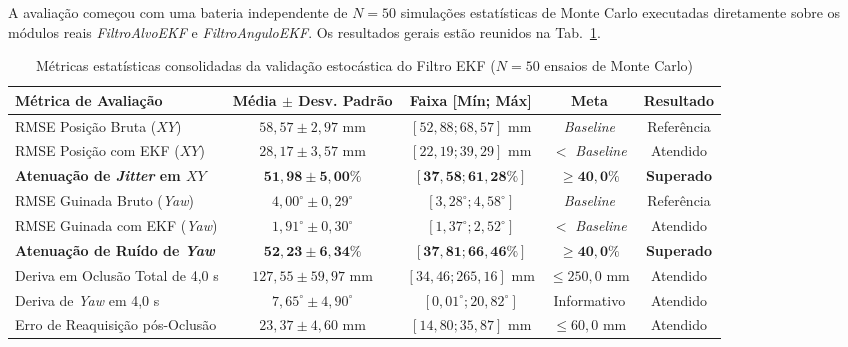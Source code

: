 A avaliação começou com uma bateria independente de $N = 50$ simulações estatísticas de Monte Carlo executadas diretamente sobre os módulos reais \textit{FiltroAlvoEKF} e \textit{FiltroAnguloEKF}. Os resultados gerais estão reunidos na Tab.~\ref{tab:validacao_ekf_resultados}.

\begin{table}[H]
	\centering
	\footnotesize
	\setlength{\tabcolsep}{2pt}
	\captionsetup{justification=centering}
	\caption{Métricas estatísticas consolidadas da validação estocástica do Filtro EKF ($N = 50$ ensaios de Monte Carlo)}
	\label{tab:validacao_ekf_resultados}
	\vspace{0.2cm}
	\begin{tabular}{>{\raggedright\arraybackslash}p{3.8cm}cccc}
		\hline
		\textbf{Métrica de Avaliação} & \textbf{Média $\pm$ Desv. Padrão} & \textbf{Faixa [Mín; Máx]} & \textbf{Meta} & \textbf{Resultado} \\
		\hline
		RMSE Posição Bruta ($XY$) & $58{,}57 \pm 2{,}97\text{ mm}$ & $[52{,}88; 68{,}57]\text{ mm}$ & \textit{Baseline} & Referência \\
		RMSE Posição com EKF ($XY$) & $28{,}17 \pm 3{,}57\text{ mm}$ & $[22{,}19; 39{,}29]\text{ mm}$ & $<$ \textit{Baseline} & Atendido \\
		\textbf{Atenuação de \textit{Jitter} em $XY$} & $\mathbf{51{,}98 \pm 5{,}00\%}$ & $[\mathbf{37{,}58; 61{,}28\%}]$ & $\mathbf{\ge 40{,}0\%}$ & \textbf{Superado} \\
		RMSE Guinada Bruto (\textit{Yaw}) & $4{,}00^\circ \pm 0{,}29^\circ$ & $[3{,}28^\circ; 4{,}58^\circ]$ & \textit{Baseline} & Referência \\
		RMSE Guinada com EKF (\textit{Yaw}) & $1{,}91^\circ \pm 0{,}30^\circ$ & $[1{,}37^\circ; 2{,}52^\circ]$ & $<$ \textit{Baseline} & Atendido \\
		\textbf{Atenuação de Ruído de \textit{Yaw}} & $\mathbf{52{,}23 \pm 6{,}34\%}$ & $[\mathbf{37{,}81; 66{,}46\%}]$ & $\mathbf{\ge 40{,}0\%}$ & \textbf{Superado} \\
		Deriva em Oclusão Total de 4,0 s & $127{,}55 \pm 59{,}97\text{ mm}$ & $[34{,}46; 265{,}16]\text{ mm}$ & $\le 250{,}0\text{ mm}$ & Atendido \\
		Deriva de \textit{Yaw} em 4,0 s & $7{,}65^\circ \pm 4{,}90^\circ$ & $[0{,}01^\circ; 20{,}82^\circ]$ & Informativo & Atendido \\
		Erro de Reaquisição pós-Oclusão & $23{,}37 \pm 4{,}60\text{ mm}$ & $[14{,}80; 35{,}87]\text{ mm}$ & $\le 60{,}0\text{ mm}$ & Atendido \\

\end{tabular}
\end{table}
